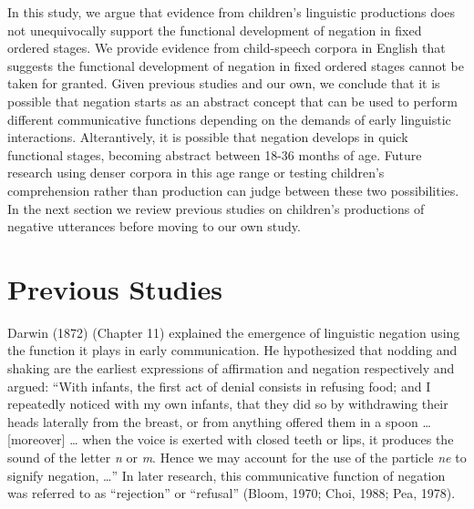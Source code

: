 \documentclass[
  english,
  man,floatsintext]{apa6}
\begin{document}
In this study, we argue that evidence from children's linguistic productions does not unequivocally support the functional development of negation in fixed ordered stages. We provide evidence from child-speech corpora in English that suggests the functional development of negation in fixed ordered stages cannot be taken for granted. Given previous studies and our own, we conclude that it is possible that negation starts as an abstract concept that can be used to perform different communicative functions depending on the demands of early linguistic interactions. Alterantively, it is possible that negation develops in quick functional stages, becoming abstract between 18-36 months of age. Future research using denser corpora in this age range or testing children's comprehension rather than production can judge between these two possibilities. In the next section we review previous studies on children's productions of negative utterances before moving to our own study.

\hypertarget{previous-studies}{%
\section{Previous Studies}\label{previous-studies}}

Darwin (1872) (Chapter 11) explained the emergence of linguistic negation using the function it plays in early communication. He hypothesized that nodding and shaking are the earliest expressions of affirmation and negation respectively and argued: ``With infants, the first act of denial consists in refusing food; and I repeatedly noticed with my own infants, that they did so by withdrawing their heads laterally from the breast, or from anything offered them in a spoon \ldots{} {[}moreover{]} \ldots{} when the voice is exerted with closed teeth or lips, it produces the sound of the letter \emph{n} or \emph{m}. Hence we may account for the use of the particle \emph{ne} to signify negation, \ldots{}'' In later research, this communicative function of negation was referred to as ``rejection'' or ``refusal'' (Bloom, 1970; Choi, 1988; Pea, 1978).
\end{document}
